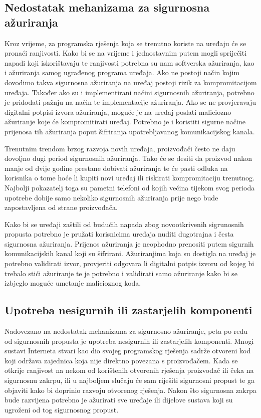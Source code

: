 \documentclass[times, utf8, diplomski]{fer}
\begin{document}
\subsection{Nedostatak mehanizama za sigurnosna ažuriranja}
Kroz vrijeme, za programska rješenja koja se trenutno koriste na uređaju će se pronaći ranjivosti. Kako bi se na vrijeme i jednostavnim putem mogli spriječiti napadi koji iskorištavaju te ranjivosti potrebna su nam softverska ažuriranja, kao i ažuriranja samog ugrađenog programa  uređaja. Ako ne postoji način kojim dovodimo takva sigurnosna ažuriranja na uređaj postoji rizik za kompromitacijom uređaja. Također ako su i implementirani načini sigurnosnih ažuriranja, potrebno je pridodati pažnju na način te implementacije ažuriranja. Ako se ne provjeravaju digitalni potpisi izvora ažuriranja, moguće je na uređaj poslati maliciozno ažuriranje koje će kompromitirati uređaj. Potrebno je i koristiti sigurne načine prijenosa tih ažuriranja poput šifriranja upotrebljavanog komunikacijskog kanala. 

Trenutnim trendom brzog razvoja novih uređaja, proizvođači često ne daju dovoljno dugi period sigurnosnih ažuriranja. Tako će se desiti da proizvod nakon manje od dvije godine prestane dobivati ažuriranja te će pasti odluka na korisnika o tome hoće li kupiti novi uređaj ili riskirati kompromitaciju trenutnog. Najbolji pokazatelj toga su pametni telefoni od kojih većina tijekom svog perioda upotrebe dobije samo nekoliko sigurnosnih ažuriranja prije nego bude zapostavljena od strane proizvođača.

Kako bi se uređaji zaštili od budućih napada zbog novootkrivenih sigrunosnih propusta potrebno je pružati korisnicima uređaja nuditi dugotrajna i česta sigurnosna ažuriranja. Prijenos ažuriranja je neophodno prenositi putem sigurnih komunikacijskih kanal koji su šifrirani. Ažuriranjima koja su dostigla na uređaj je potrebno validirati izvor, provjeriti odgovara li digitalni potpis izvoru od kojeg bi trebalo stići ažuriranje te je potrebno i validirati samo ažuriranje kako bi se izbjeglo moguće umetanje malicioznog koda.

\subsection{Upotreba nesigurnih ili zastarjelih komponenti}
Nadovezano na nedostatak mehanizama za sigurnosno ažuriranje, peta po redu od sigurnosnih propusta je upotreba nesigurnih ili zastarjelih komponenti. Mnogi sustavi Interneta stvari kao dio svojeg programskog rješenja sadrže otvoreni kod koji održava zajednica koja nije direktno povezana s proizvođačem. Kada se otkrije ranjivost na nekom od korištenih otvorenih rješenja proizvođač ili čeka na sigurnosnu zakrpu, ili u najboljem slučaju će sam riješiti sigurnosni propust te ga objaviti kako bi doprinio razvoju otvorenog rješenja. Nakon što sigurnosna zakrpa bude razvijena potrebno je ažurirati sve uređaje ili dijelove sustava koji su ugroženi od tog sigurnosnog propust. 
\end{document}
